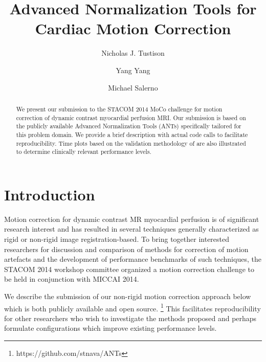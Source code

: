 \documentclass{llncs}
\begin{document}
%
\frontmatter          %
%

\mainmatter              %
%
\title{Advanced Normalization Tools for Cardiac Motion Correction}
%
\titlerunning{}  %
%
\author{Nicholas J. Tustison \and Yang Yang \and Michael Salerno}


\maketitle              %

\begin{abstract}
We present our submission to the STACOM 2014 MoCo challenge for 
motion correction of dynamic contrast myocardial perfusion
MRI.  Our submission is based on the publicly available Advanced
Normalization Tools (ANTs) specifically tailored for this problem
domain.  We provide a brief description with actual code calls
to facilitate reproducibility.  Time plots based on the
validation methodology of \cite{pack2010} are also illustrated
to determine clinically relevant performance levels.
\end{abstract}

\section{Introduction}

Motion correction for dynamic contrast MR myocardial perfusion is of significant
research interest and has resulted in several techniques generally characterized as
rigid or non-rigid image registration-based.  To bring together interested 
researchers for discussion and comparison of methods for correction of motion
artefacts and the development of performance benchmarks of such techniques, 
the STACOM 2014 workshop committee organized a motion correction challenge 
to be held in conjunction with MICCAI 2014.

We describe the submission of our non-rigid motion correction approach
below which is both publicly available and open source.%
\footnote{
https://github.com/stnava/ANTs
}
This facilitates 
reproducibility for other researchers who wish to investigate the methods
proposed and perhaps formulate configurations which improve existing
performance levels.
\end{document}
